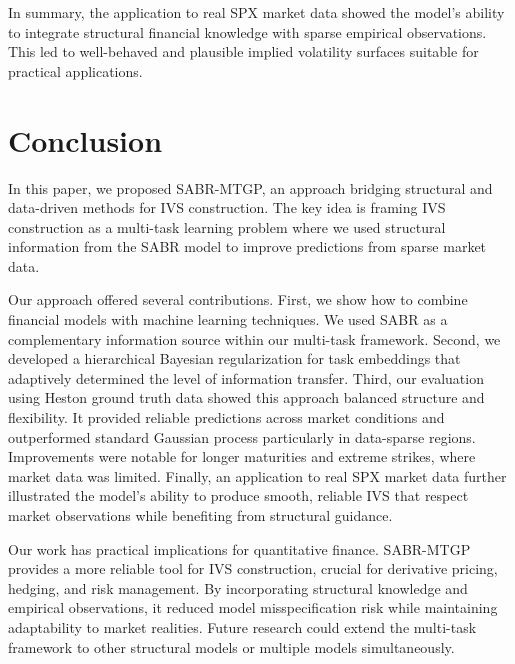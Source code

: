 \documentclass[preprint,12pt]{elsarticle}
\begin{document}
In summary, the application to real SPX market data showed the model's ability to integrate structural financial knowledge with sparse empirical observations. This led to well-behaved and plausible implied volatility surfaces suitable for practical applications.


\section{Conclusion}

In this paper, we proposed SABR-MTGP, an approach bridging structural and data-driven methods for IVS construction. The key idea is framing IVS construction as a multi-task learning problem where we used structural information from the SABR model to improve predictions from sparse market data.

Our approach offered several contributions. First, we show how to combine financial models with machine learning techniques. We used SABR as a complementary information source within our multi-task framework. Second, we developed a hierarchical Bayesian regularization for task embeddings that adaptively determined the level of information transfer. Third, our evaluation using Heston ground truth data showed this approach balanced structure and flexibility. It provided reliable predictions across market conditions and outperformed standard Gaussian process particularly in data-sparse regions. Improvements were notable for longer maturities and extreme strikes, where market data was limited. Finally, an application to real SPX market data further illustrated the model's ability to produce smooth, reliable IVS that respect market observations while benefiting from structural guidance.

Our work has practical implications for quantitative finance. SABR-MTGP provides a more reliable tool for IVS construction, crucial for derivative pricing, hedging, and risk management. By incorporating structural knowledge and empirical observations, it reduced model misspecification risk while maintaining adaptability to market realities. Future research could extend the multi-task framework to other structural models or multiple models simultaneously.
 

\end{document}
